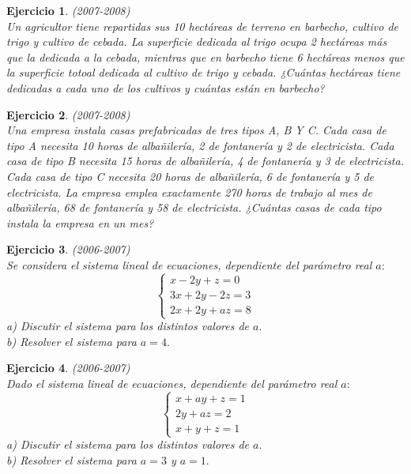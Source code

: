 \documentclass[12pt, a4paper]{amsart}
\newtheorem{ejer}{Ejercicio}
\begin{document}
\begin{ejer}\em (2007-2008)\\%
Un agricultor tiene repartidas sus 10 hectáreas de terreno en barbecho, cultivo de trigo y cultivo de cebada. La superficie dedicada al trigo ocupa 2 hectáreas más que la dedicada a la cebada, mientras que en barbecho tiene 6 hectáreas menos que la superficie totoal dedicada al cultivo de trigo y cebada. ¿Cuántas hectáreas tiene dedicadas a cada uno de los cultivos y cuántas están en barbecho?
\end{ejer}

\begin{ejer}\em  (2007-2008)\\%
Una empresa instala casas prefabricadas de tres tipos A, B Y C. Cada casa de tipo A necesita 10 horas de albañilería, 2 de fontanería y 2 de electricista. Cada casa de tipo B necesita 15 horas de albañilería, 4 de fontanería y 3 de electricista. Cada casa de tipo C necesita 20 horas de albañilería, 6 de fontanería y 5 de electricista. La empresa emplea exactamente 270 horas de trabajo al mes de albañilería, 68 de fontanería y 58 de electricista. ¿Cuántas casas de cada tipo instala la empresa en un mes?
\end{ejer}

\begin{ejer}\em (2006-2007)\\
Se considera el sistema lineal de ecuaciones, dependiente del parámetro real $a:$
\begin{equation*}
\left \{ \begin{matrix} x-2y+z=0
\\ 3x+2y-2z=3
\\ 2x+2y+az=8 \end{matrix}\right. 
\end{equation*}
a) Discutir el sistema para los distintos valores de $a.$\\
b) Resolver el sistema para $a=4.$
\end{ejer}

\begin{ejer}\em (2006-2007)\\
Dado el sistema lineal de ecuaciones, dependiente del parámetro real $a:$
\begin{equation*}
\left \{ \begin{matrix} x+ay+z=1
\\ 2y+az=2
\\x+y+z=1 \end{matrix}\right. 
\end{equation*}
a) Discutir el sistema para los distintos valores de $a.$\\
b) Resolver el sistema para $a=3$ y $a=1.$
\end{ejer}
\end{document}
